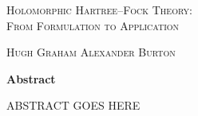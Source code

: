 \thispagestyle{plain}
\begin{center}
\textsc{\Large Holomorphic Hartree--Fock Theory:\\ From Formulation to Application}

    \vspace{0.2cm}
    \normalsize{{\textsc{Hugh Graham Alexander Burton}}}
    
\vspace{0.2cm}
    \normalsize{\textbf{Abstract}}
\end{center}
ABSTRACT GOES HERE
